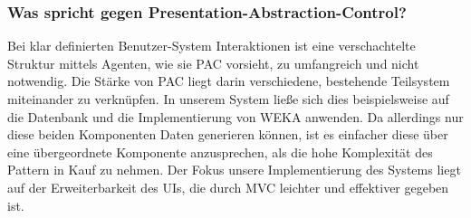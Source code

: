 \subsubsection{Was spricht gegen Presentation-Abstraction-Control?}
Bei klar definierten Benutzer-System Interaktionen ist eine verschachtelte Struktur mittels Agenten, wie sie PAC vorsieht, zu umfangreich und nicht notwendig. 
Die Stärke von PAC liegt darin verschiedene, bestehende Teilsystem miteinander zu verknüpfen. In unserem System ließe sich dies beispielsweise auf die Datenbank und die Implementierung von WEKA anwenden. Da allerdings nur diese beiden Komponenten Daten generieren können, ist es einfacher diese über eine übergeordnete Komponente anzusprechen, als die hohe Komplexität des Pattern in Kauf zu nehmen. 
Der Fokus unsere Implementierung des Systems liegt auf der Erweiterbarkeit des UIs, die durch MVC leichter und effektiver gegeben ist.
